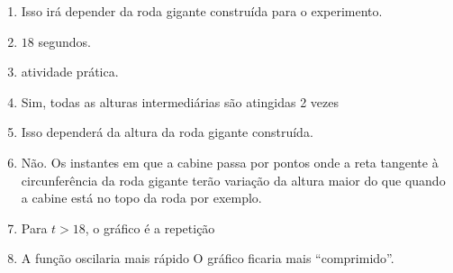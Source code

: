 \documentclass[10 pt,usenames,dvipsnames, oneside]{article}
\begin{document}
\ifdefined\prof
\begin{solucao}

\begin{enumerate}
\item Isso irá depender da roda gigante construída para o
experimento.
\item $18$ segundos.
\item atividade prática.
\item Sim, todas as alturas intermediárias são atingidas 2 vezes
\item Isso dependerá da altura da roda gigante construída.
\item Não. Os instantes em que a cabine passa por pontos onde a
reta tangente à circunferência da roda gigante terão variação
da altura maior do que quando a cabine está no topo da roda
por exemplo.
\item Para $t>18$, o gráfico é a repetição
\item A função oscilaria mais rápido O gráfico ficaria mais
“comprimido”.
\end{enumerate}

\end{solucao}
\fi
\end{document}
